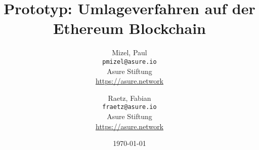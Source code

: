 
\title{Prototyp: Umlageverfahren auf der Ethereum Blockchain}
\author{
  Mizel, Paul\\
  \texttt{pmizel@asure.io}\\
  Asure Stiftung \\ 
  {\url{https://asure.network}}\\
  \and
  Raetz, Fabian\\
  \texttt{fraetz@asure.io}\\
  Asure Stiftung \\ 
  {\url{https://asure.network}}\\
}

\date{\today}
\maketitle

